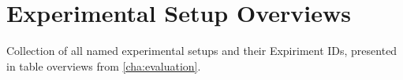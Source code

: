 \chapter{Experimental Setup Overviews}
\label{app:exp_overviews}
Collection of all named experimental setups and their Expiriment IDs, presented in table overviews from \autoref{cha:evaluation}.

\begin{table}[ht]
    \myfloatalign
    
\end{table}

\begin{table}[ht]
    \myfloatalign
    
\end{table}

\begin{table}[ht]
    \myfloatalign
    
\end{table}

\begin{table}[ht]
    \myfloatalign
    
\end{table}

\begin{table}[ht]
    \myfloatalign
    
\end{table}


\begin{table}[ht]
    \myfloatalign
    
\end{table}

\begin{table}[ht]
    \myfloatalign
    
\end{table}

\begin{table}[ht]
    \myfloatalign
    
\end{table}


\begin{table}[ht]
    \myfloatalign
    
\end{table}